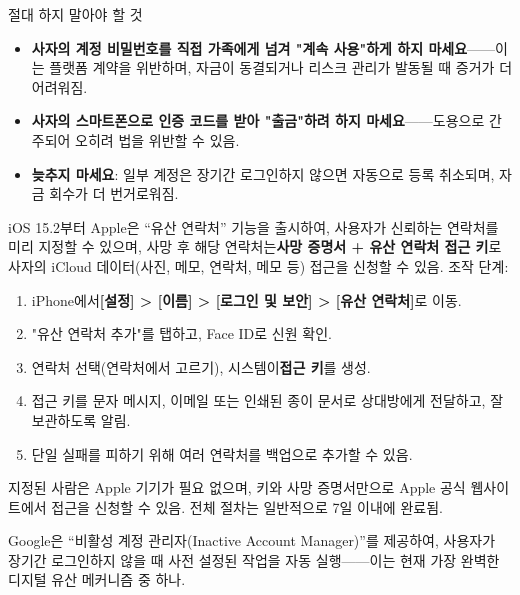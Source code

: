 \begin{tcbwarn}{절대 하지 말아야 할 것}
\begin{itemize}
  \item \textbf{사자의 계정 비밀번호를 직접 가족에게 넘겨 "계속 사용"하게 하지 마세요}——이는 플랫폼 계약을 위반하며, 자금이 동결되거나 리스크 관리가 발동될 때 증거가 더 어려워짐.
  \item \textbf{사자의 스마트폰으로 인증 코드를 받아 "출금"하려 하지 마세요}——도용으로 간주되어 오히려 법을 위반할 수 있음.
  \item \textbf{늦추지 마세요}: 일부 계정은 장기간 로그인하지 않으면 자동으로 등록 취소되며, 자금 회수가 더 번거로워짐.
\end{itemize}

\end{tcbwarn}


iOS 15.2부터 Apple은 “유산 연락처” 기능을 출시하여, 사용자가 신뢰하는 연락처를 미리 지정할 수 있으며, 사망 후 해당 연락처는\textbf{사망 증명서 + 유산 연락처 접근 키}로 사자의 iCloud 데이터(사진, 메모, 연락처, 메모 등) 접근을 신청할 수 있음. 조작 단계:

\begin{enumerate}
  \item iPhone에서\textbf{[설정] > [이름] > [로그인 및 보안] > [유산 연락처]}로 이동.
  \item "유산 연락처 추가"를 탭하고, Face ID로 신원 확인.
  \item 연락처 선택(연락처에서 고르기), 시스템이\textbf{접근 키}를 생성.
  \item 접근 키를 문자 메시지, 이메일 또는 인쇄된 종이 문서로 상대방에게 전달하고, 잘 보관하도록 알림.
  \item 단일 실패를 피하기 위해 여러 연락처를 백업으로 추가할 수 있음.
\end{enumerate}

지정된 사람은 Apple 기기가 필요 없으며, 키와 사망 증명서만으로 Apple 공식 웹사이트에서 접근을 신청할 수 있음. 전체 절차는 일반적으로 7일 이내에 완료됨.


Google은 “비활성 계정 관리자(Inactive Account Manager)”를 제공하여, 사용자가 장기간 로그인하지 않을 때 사전 설정된 작업을 자동 실행——이는 현재 가장 완벽한 디지털 유산 메커니즘 중 하나.

